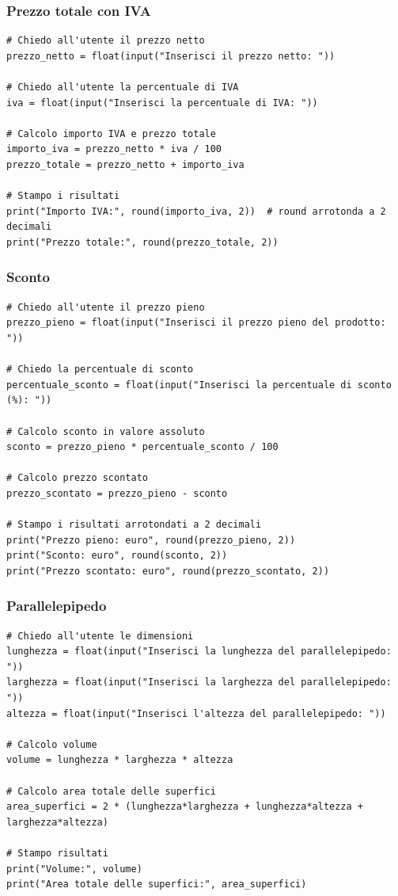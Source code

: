 \documentclass[a4paper,12pt]{article}
\begin{document}
	\newpage
	\subsubsection{Prezzo totale con IVA}
	\begin{lstlisting}
# Chiedo all'utente il prezzo netto
prezzo_netto = float(input("Inserisci il prezzo netto: "))

# Chiedo all'utente la percentuale di IVA
iva = float(input("Inserisci la percentuale di IVA: "))
	
# Calcolo importo IVA e prezzo totale
importo_iva = prezzo_netto * iva / 100
prezzo_totale = prezzo_netto + importo_iva
		
# Stampo i risultati
print("Importo IVA:", round(importo_iva, 2))  # round arrotonda a 2 decimali
print("Prezzo totale:", round(prezzo_totale, 2))
	\end{lstlisting}
	
	\newpage
	\subsubsection{Sconto}
	\begin{lstlisting}
# Chiedo all'utente il prezzo pieno
prezzo_pieno = float(input("Inserisci il prezzo pieno del prodotto: "))
		
# Chiedo la percentuale di sconto
percentuale_sconto = float(input("Inserisci la percentuale di sconto (%): "))

# Calcolo sconto in valore assoluto
sconto = prezzo_pieno * percentuale_sconto / 100

# Calcolo prezzo scontato
prezzo_scontato = prezzo_pieno - sconto

# Stampo i risultati arrotondati a 2 decimali
print("Prezzo pieno: euro", round(prezzo_pieno, 2))
print("Sconto: euro", round(sconto, 2))
print("Prezzo scontato: euro", round(prezzo_scontato, 2))
	\end{lstlisting}
	

	\newpage
	\subsubsection{Parallelepipedo}
	\begin{lstlisting}
# Chiedo all'utente le dimensioni
lunghezza = float(input("Inserisci la lunghezza del parallelepipedo: "))
larghezza = float(input("Inserisci la larghezza del parallelepipedo: "))
altezza = float(input("Inserisci l'altezza del parallelepipedo: "))
		
# Calcolo volume
volume = lunghezza * larghezza * altezza
		
# Calcolo area totale delle superfici
area_superfici = 2 * (lunghezza*larghezza + lunghezza*altezza + larghezza*altezza)
		
# Stampo risultati
print("Volume:", volume)
print("Area totale delle superfici:", area_superfici)
	\end{lstlisting}
	
\end{document}
